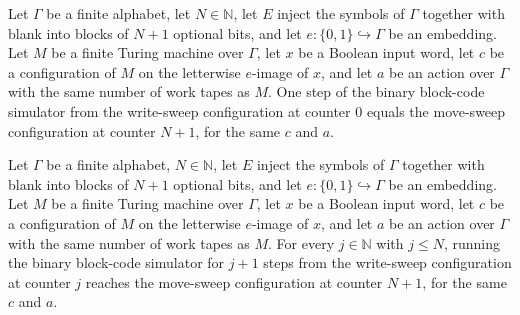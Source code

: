 \begin{lemma}
\label{Turing.FinTM.arWriteCfg_finish}
\leanok
{}
Let $\Gamma$ be a finite alphabet, let $N\in\mathbb{N}$, let $E$ inject the symbols of
$\Gamma$ together with blank into blocks of $N+1$ optional bits, and let
$e:\{0,1\}\hookrightarrow\Gamma$ be an embedding. Let $M$ be a finite Turing machine
over $\Gamma$, let $x$ be a Boolean input word, let $c$ be a configuration of $M$ on the
letterwise $e$-image of $x$, and let $a$ be an action over $\Gamma$ with the same number
of work tapes as $M$. One step of the binary block-code simulator from the write-sweep
configuration at counter $0$ equals the move-sweep configuration at counter $N+1$, for
the same $c$ and $a$.
\end{lemma}

\begin{lemma}
\label{Turing.FinTM.arWriteCfg_run}
\leanok
{}
Let $\Gamma$ be a finite alphabet, $N\in\mathbb{N}$, let $E$ inject the symbols of
$\Gamma$ together with blank into blocks of $N+1$ optional bits, and let
$e:\{0,1\}\hookrightarrow\Gamma$ be an embedding. Let $M$ be a finite Turing machine
over $\Gamma$, let $x$ be a Boolean input word, let $c$ be a configuration of $M$ on the
letterwise $e$-image of $x$, and let $a$ be an action over $\Gamma$ with the same number
of work tapes as $M$. For every $j\in\mathbb{N}$ with $j\le N$, running the binary
block-code simulator for $j+1$ steps from the write-sweep configuration at counter $j$
reaches the move-sweep configuration at counter $N+1$, for the same $c$ and $a$.
\end{lemma}

